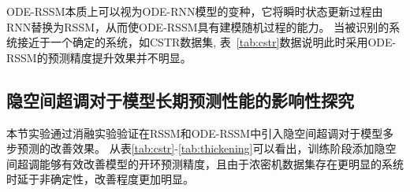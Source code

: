 ODE-RSSM本质上可以视为ODE-RNN模型的变种，它将瞬时状态更新过程由RNN替换为RSSM，从而使ODE-RSSM具有建模随机过程的能力。
当被识别的系统接近于一个确定的系统，如CSTR数据集, 表~\ref{tab:cstr}数据说明此时采用ODE-RSSM的预测精度提升效果并不明显。


\subsection{ 隐空间超调对于模型长期预测性能的影响性探究}

本节实验通过消融实验验证在RSSM和ODE-RSSM中引入隐空间超调对于模型多步预测的改善效果。
从表\ref{tab:cstr}-\ref{tab:thickening}可以看出，训练阶段添加隐空间超调能够有效改善模型的开环预测精度，且由于浓密机数据集存在更明显的系统时延于非确定性，改善程度更加明显。


